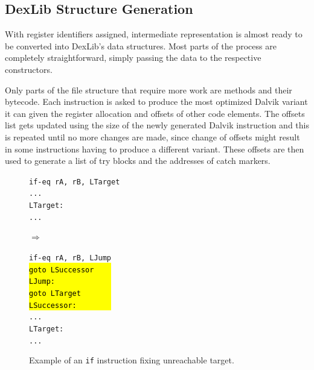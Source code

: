\documentclass[12pt,twoside,notitlepage]{report}
\newcommand{\asm}[1] {\texttt{#1}}
\newcommand{\asmExtra}[1] {\texttt{\hl{#1}}}
\begin{document}
\subsection{DexLib Structure Generation}

With register identifiers assigned, intermediate representation is almost ready to be converted into DexLib's data structures. Most parts of the process are completely straightforward, simply passing the data to the respective constructors. 

Only parts of the file structure that require more work are methods and their bytecode. Each instruction is asked to produce the most optimized Dalvik variant it can given the register allocation and offsets of other code elements. The offsets list gets updated using the size of the newly generated Dalvik instruction and this is repeated until no more changes are made,  since change of offsets might result in some instructions having to produce a different variant. These offsets are then used to generate a list of try blocks and the addresses of catch markers.

\begin{figure}
	\centering
	\begin{minipage}{0.28\textwidth}
	\begin{footnotesize}
		\asm{if-eq rA, rB, LTarget} \\
		\asm{...} \\
		\asm{LTarget:} \\
		\asm{...}
	\end{footnotesize}
	\end{minipage}
	\begin{minipage}{0.09\textwidth}
	\centering
	$\Rightarrow$
	\end{minipage}
	\begin{minipage}{0.25\textwidth}
	\begin{footnotesize}
		\asm{if-eq rA, rB, LJump} \\
		\asmExtra{goto LSuccessor~~~~} \\
		\asmExtra{LJump:~~~~~~~~~~~~~} \\
		\asmExtra{goto LTarget~~~~~~~} \\
		\asmExtra{LSuccessor:~~~~~~~~} \\
		\asm{...} \\
		\asm{LTarget:} \\
		\asm{...}
	\end{footnotesize}
	\end{minipage}
	\caption{Example of an \texttt{if} instruction fixing unreachable target.}
	\label{figure:Reassembling_FixLongJump}
\end{figure}
\end{document}
